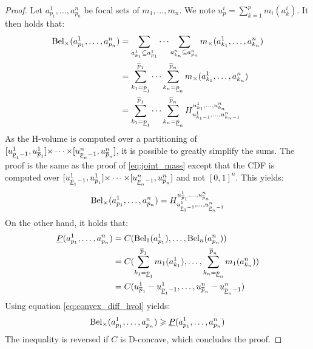 \begin{proof}
    Let $a^1_{p_1},\dots,a^n_{p_n}$ be focal sets of $m_1,\dots,m_n$. We note $u^i_p=\sum_{k=1}^p m_i(a^i_k)$. It then holds that:
    \begin{align*}
        {\mathrm{Bel}}_\times(a^1_{p_1}, \dots, a^n_{p_n}) &= \sum_{a^1_{k_1}\subseteq a^1_{p_1}}\dots\sum_{a^n_{k_n}\subseteq a^n_{p_n}}m_\times(a^1_{k_1},\dots, a^n_{k_n})\\
        &= \sum_{k_1=\underline{p}_1}^{\overline{p}_1}\dots\sum_{k_n=\underline{p}_n}^{\overline{p}_n}m_\times(a^1_{k_1},\dots, a^n_{k_n})\\
        &= \sum_{k_1=\underline{p}_1}^{\overline{p}_1}\dots\sum_{k_n=\underline{p}_n}^{\overline{p}_n}H_{u^1_{k_1-1},\dots,u^n_{k_n-1}}^{u^1_{k_1},\dots,u^n_{k_n}}
    \end{align*}
    As the H-volume is computed over a partitioning of $[u^1_{\underline{p}_1-1}, u^1_{\overline{p}_1}]{\times\dots\times}[u^n_{\underline{p}_n-1} , u^n_{\overline{p}_n}]$, it is possible to greatly simplify the sums. The proof is the same as the proof of \eqref{eq:joint_mass} except that the CDF is computed over $[u^1_{\underline{p}_1-1}, u^1_{\overline{p}_1}]{\times\dots\times}[u^n_{\underline{p}_n-1} , u^n_{\overline{p}_n}]$ and not $[0,1]^n$. This yields:
    \begin{align*}
        {\mathrm{Bel}}_\times(a^1_{p_1}, \dots, a^n_{p_n}) = H_{u^1_{\underline{p}_1-1},\dots,u^n_{\underline{p}_n-1}}^{u^1_{\overline{p}_1},\dots,u^n_{\overline{p}_n}}
    \end{align*}
    On the other hand, it holds that:
    \begin{align*}
        \underline{P}(a^1_{p_1}, \dots, a^n_{p_n}) &= C({\mathrm{Bel}}_1(a^1_{p_1}),\dots,{\mathrm{Bel}}_n(a^n_{p_n}))\\
        &= C(\sum_{k_1=\underline{p}_1}^{\overline{p}_1} m_1(a^1_{k_1}), \dots, \sum_{k_n=\underline{p}_n}^{\overline{p}_n} m_1(a^n_{k_n}))\\
        &= C(u^1_{\overline{p}_1} - u^1_{\underline{p}_1-1}, \dots, u^n_{\overline{p}_n} - u^n_{\underline{p}_n-1})
    \end{align*}
    Using equation \eqref{eq:convex_diff_hvol} yields:
    \begin{align*}
        {\mathrm{Bel}}_\times(a^1_{p_1}, \dots, a^n_{p_n}) \geqslant \underline{P}(a^1_{p_1}, \dots, a^n_{p_n})
    \end{align*}
    The inequality is reversed if $C$ is D-concave, which concludes the proof.
\end{proof}

